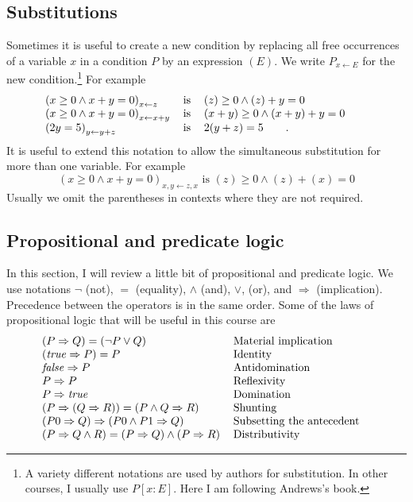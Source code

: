 \documentclass[muchmore,11pt]{article}%
\begin{document}
\subsection{Substitutions}

Sometimes it is useful to create a new condition by replacing all free
occurrences of a variable $x$ in a condition $P$ by an expression $(E)$. We
write $P_{x\leftarrow E}$ for the new condition.\footnote{A variety different
notations are used by authors for substitution. In other courses, I usually
use $P[x:E]$. Here I am following Andrews's book.} For example%
\[%
\begin{tabular}
[c]{lll}%
$\left(  x\geq0\wedge x+y=0\right)  _{x\leftarrow z}$ & is & $\left(
z\right)  \geq0\wedge\left(  z\right)  +y=0$\\
$\left(  x\geq0\wedge x+y=0\right)  _{x\leftarrow x+y}$ & is & $\left(
x+y\right)  \geq0\wedge\left(  x+y\right)  +y=0$\\
$\left(  2y=5\right)  _{y\leftarrow y+z}$ & is & $2(y+z)=5\qquad\text{.}$%
\end{tabular}
\ \ \ \ \ \
\]
It is useful to extend this notation to allow the simultaneous substitution
for more than one variable. For example%
\[
\left(  x\geq0\wedge x+y=0\right)  _{x,y\leftarrow z,x}\text{ is }\left(
z\right)  \geq0\wedge\left(  z\right)  +\left(  x\right)  =0
\]
Usually we omit the parentheses in contexts where they are not required.

\subsection{Propositional and predicate logic}

In this section, I will review a little bit of propositional and predicate
logic. We use notations $\lnot$ (not), $=$ (equality), $\wedge$ (and), $\vee$,
(or), and $\Rightarrow$ (implication). Precedence between the operators is in
the same order. Some of the laws of propositional logic that will be useful in
this course are%
\[%
\begin{tabular}
[c]{ll}%
$\left(  P\Rightarrow Q\right)  =\left(  \lnot P\vee Q\right)  $ & Material
implication\\
$\left(  \mathit{true}\Rightarrow P\right)  =P$ & Identity\\
$\mathit{false}\Rightarrow P$ & Antidomination\\
$P\Rightarrow P$ & Reflexivity\\
$P\Rightarrow\mathit{true}$ & Domination\\
$\left(  P\Rightarrow(Q\Rightarrow R)\right)  =\left(  P\wedge Q\Rightarrow
R\right)  $ & Shunting\\
$\left(  P0\Rightarrow Q\right)  \Rightarrow\left(  P0\wedge P1\Rightarrow
Q\right)  $ & Subsetting the antecedent\\
$\left(  P\Rightarrow Q\wedge R\right)  =\left(  P\Rightarrow Q\right)
\wedge\left(  P\Rightarrow R\right)  $ & Distributivity
\end{tabular}
\ \ \
\]
\end{document}
